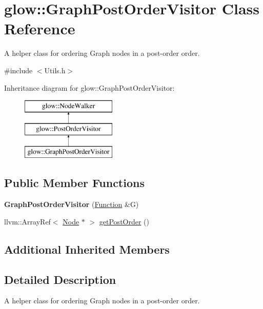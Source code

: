 \hypertarget{classglow_1_1_graph_post_order_visitor}{}\section{glow\+:\+:Graph\+Post\+Order\+Visitor Class Reference}
\label{classglow_1_1_graph_post_order_visitor}


A helper class for ordering Graph nodes in a post-\/order order.  




{\ttfamily \#include $<$Utils.\+h$>$}

Inheritance diagram for glow\+:\+:Graph\+Post\+Order\+Visitor\+:\begin{figure}[H]
\begin{center}
\leavevmode
\includegraphics[height=3.000000cm]{classglow_1_1_graph_post_order_visitor}
\end{center}
\end{figure}
\subsection*{Public Member Functions}
\begin{DoxyCompactItemize}
\item 
\mbox{\label{classglow_1_1_graph_post_order_visitor_a9cec33fe9eda8a285b6db5d5c36a8e12}} 
{\bfseries Graph\+Post\+Order\+Visitor} (\hyperlink{classglow_1_1_function}{Function} \&G)
\item 
llvm\+::\+Array\+Ref$<$ \hyperlink{classglow_1_1_node}{Node} $\ast$ $>$ \hyperlink{classglow_1_1_graph_post_order_visitor_ad0e6253030f155ffd071699f41906798}{get\+Post\+Order} ()
\end{DoxyCompactItemize}
\subsection*{Additional Inherited Members}


\subsection{Detailed Description}
A helper class for ordering Graph nodes in a post-\/order order. 

